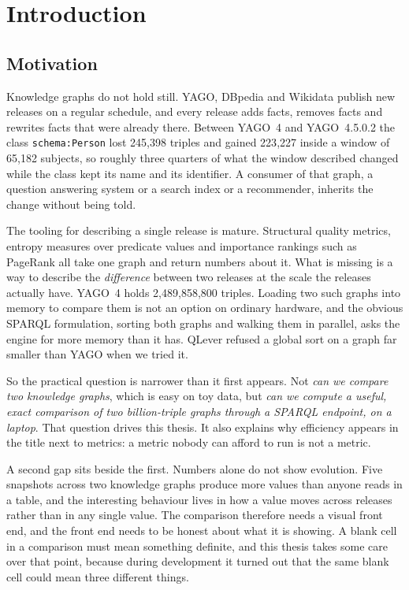 \chapter{Introduction}
\label{chap:introduction}

\section{Motivation}
\label{sec:motivation}

Knowledge graphs do not hold still. YAGO, DBpedia and Wikidata publish new
releases on a regular schedule, and every release adds facts, removes facts and
rewrites facts that were already there. Between YAGO~4 and YAGO~4.5.0.2 the
class \texttt{schema:Person} lost 245{,}398 triples and gained 223{,}227 inside
a window of 65{,}182 subjects, so roughly three quarters of what the window
described changed while the class kept its name and its identifier. A consumer
of that graph, a question answering system or a search index or a
recommender, inherits the change without being told.

The tooling for describing a single release is mature. Structural quality
metrics, entropy measures over predicate values and importance rankings such as
PageRank all take one graph and return numbers about it. What is missing is a
way to describe the \emph{difference} between two releases at the scale the
releases actually have. YAGO~4 holds 2{,}489{,}858{,}800 triples. Loading two
such graphs into memory to compare them is not an option on ordinary hardware,
and the obvious SPARQL formulation, sorting both graphs and walking them in
parallel, asks the engine for more memory than it has. QLever refused a global
sort on a graph far smaller than YAGO when we tried it.

So the practical question is narrower than it first appears. Not \emph{can we
compare two knowledge graphs}, which is easy on toy data, but \emph{can we
compute a useful, exact comparison of two billion-triple graphs through a SPARQL
endpoint, on a laptop}. That question drives this thesis. It also explains why
efficiency appears in the title next to metrics: a metric nobody can afford to
run is not a metric.

A second gap sits beside the first. Numbers alone do not show evolution. Five
snapshots across two knowledge graphs produce more values than anyone reads in a
table, and the interesting behaviour lives in how a value moves across releases
rather than in any single value. The comparison therefore needs a visual front
end, and the front end needs to be honest about what it is showing. A blank cell
in a comparison must mean something definite, and this thesis takes some care
over that point, because during development it turned out that the same blank
cell could mean three different things.


